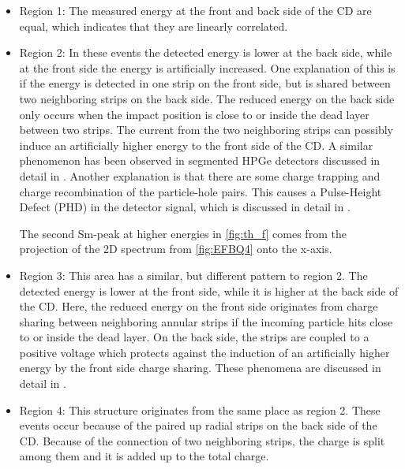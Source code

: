 \documentclass[twoside,english]{uiofysmaster/uiofysmaster}
\let\orgautoref\autoref
\renewcommand{\autoref}
        {%
		 \def\sectionautorefname{Section}%
		 \def\subsectionautorefname{Section}%
		 \def\subsubsectionautorefname{Section}%
		 \def\chapterautorefname{Chapter}%
          \orgautoref}
\begin{document}
\begin{itemize}
	\item Region 1: The measured energy at the front and back side of the CD are equal, which indicates that they are linearly correlated.
	\item Region 2: In these events the detected energy is lower at the back side, while at the front side the energy is artificially increased. 
	One explanation of this is if the energy is detected in one strip on the front side, but is shared between two neighboring strips on the back side.
	The reduced energy on the back side only occurs when the impact position is close to or inside the dead layer between two strips. 
	The current from the two neighboring strips can possibly induce an artificially higher energy to the front side of the CD. 
	A similar phenomenon has been observed in segmented HPGe detectors discussed in detail in \cite{Bruyneel2006a, Bruyneel2006b, Bruyneel, Descovich2005, Abt2017}.	
	Another explanation is that there are some charge trapping and charge recombination of the particle-hole pairs. 
	This causes a Pulse-Height Defect (PHD) in the detector signal, which is discussed in detail in \cite{Miller1962, Wilkins1971}.
	
	The second Sm-peak at higher energies in \autoref{fig:th_f} comes from the projection of the 2D spectrum from \autoref{fig:EFBQ4} onto the x-axis.
	\item Region 3: This area has a similar, but different pattern to region 2. 
	The detected energy is lower at the front side, while it is higher at the back side of the CD. 
	Here, the reduced energy on the front side originates from charge sharing between neighboring annular strips if the incoming particle hits close to or inside the dead layer. 
	 On the back side, the strips are coupled to a positive voltage which protects against the induction of an artificially higher energy by the front side charge sharing. 
	These phenomena are discussed in detail in \cite{Grassi2014, Kramberger2002}.
	\item Region 4: This structure originates from the same place as region 2.
	These events occur because of the paired up radial strips on the back side of the CD.  
	Because of the connection of two neighboring strips, the charge is split among them and it is added up to the total charge.
\end{itemize}
\end{document}
